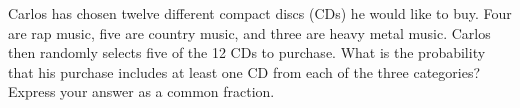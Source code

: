 Carlos has chosen twelve different compact discs (CDs) he would like to buy. Four are rap music, five are country music, and three are heavy metal music. Carlos then randomly selects five of the 12 CDs to purchase. What is the probability that his purchase includes at least one CD from each of the three categories? Express your answer as a common fraction.
